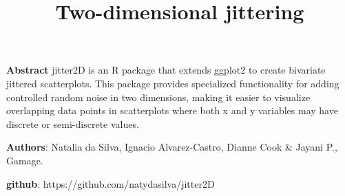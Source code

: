 \documentclass[
  letterpaper,
  DIV=11,
  numbers=noendperiod]{scrartcl}
\title{Two-dimensional jittering}
\author{}
\date{}
\begin{document}
\maketitle


\textbf{Abstract} jitter2D is an R package that extends ggplot2 to
create bivariate jittered scatterplots. This package provides
specialized functionality for adding controlled random noise in two
dimensions, making it easier to visualize overlapping data points in
scatterplots where both x and y variables may have discrete or
semi-discrete values.

\textbf{Authors}: Natalia da Silva, Ignacio Alvarez-Castro, Dianne Cook
\& Jayani P., Gamage.

\textbf{github}: https://github.com/natydasilva/jitter2D
\end{document}
